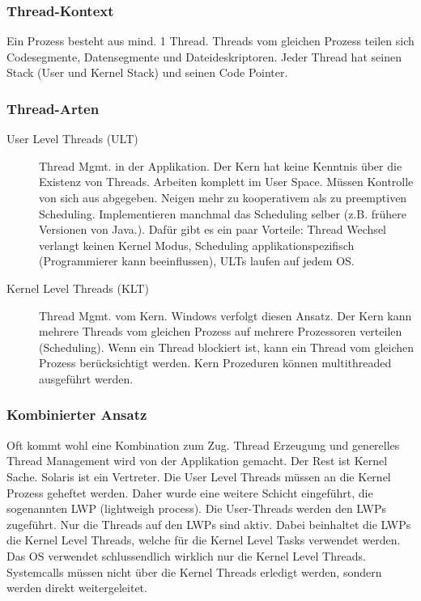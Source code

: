 \subsubsection{Thread-Kontext}
Ein Prozess besteht aus mind. 1 Thread. Threads vom gleichen Prozess teilen sich Codesegmente, Datensegmente und Dateideskriptoren. Jeder Thread hat seinen Stack (User und Kernel Stack) und seinen Code Pointer.

\subsubsection{Thread-Arten}
\begin{description}
	\item[User Level Threads (ULT)]
	Thread Mgmt. in der Applikation. Der Kern hat keine Kenntnis über die Existenz von Threads. Arbeiten komplett im User Space. Müssen Kontrolle von sich aus abgegeben. Neigen mehr zu kooperativem als zu preemptiven Scheduling. Implementieren manchmal das Scheduling selber (z.B. frühere Versionen von Java.).
	Dafür gibt es ein paar Vorteile: Thread Wechsel verlangt keinen Kernel Modus, Scheduling applikationspezifisch (Programmierer kann beeinflussen), ULTs laufen auf jedem OS.
	\item[Kernel Level Threads (KLT)]
	Thread Mgmt. vom Kern. Windows verfolgt diesen Ansatz. Der Kern kann mehrere Threads vom gleichen Prozess auf mehrere Prozessoren verteilen (Scheduling). Wenn ein Thread blockiert ist, kann ein Thread vom gleichen Prozess berücksichtigt werden. Kern Prozeduren können multithreaded ausgeführt werden.
\end{description}

\subsubsection{Kombinierter Ansatz}
Oft kommt wohl eine Kombination zum Zug. Thread Erzeugung und generelles Thread Management wird von der Applikation gemacht. Der Rest ist Kernel Sache. Solaris ist ein Vertreter. Die User Level Threads müssen an die Kernel Prozess geheftet werden. Daher wurde eine weitere Schicht eingeführt, die sogenannten LWP (lightweigh process). Die User-Threads werden den LWPs zugeführt. Nur die Threads auf den LWPs sind aktiv. Dabei beinhaltet die LWPs die Kernel Level Threads, welche für die Kernel Level Tasks verwendet werden. Das OS verwendet schlussendlich wirklich nur die Kernel Level Threads. Systemcalls müssen nicht über die Kernel Threads erledigt werden, sondern werden direkt weitergeleitet.

